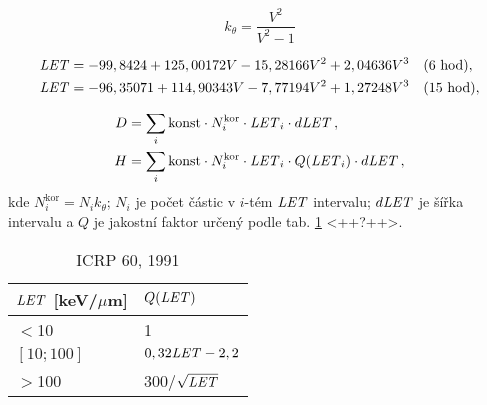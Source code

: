 \begin{equation}
  k_{\theta}=\frac{V^2}{V^2-1}
  \label{eq:kritickyUhel}
\end{equation}


\cite{ssntd}
\begin{align}
  \mathit{LET} &= -99,8424+125,00172  V-15,28166  V^2+2,04636  V^3\quad\text{(6 hod)},\label{eq:kalibracniKrivkaSestHod}\\
  \mathit{LET} &= -96,35071+114,90343  V-7,77194  V^2+1,27248  V^3\quad\text{(15 hod)},\label{eq:kalibracniKrivkaPatnactHod}
\end{align}

\begin{align}
  D&=\sum_i\text{konst}\cdot N_i^{\text{kor}}\cdot \mathit{LET}_i\cdot d\mathit{LET}\,,\label{eq:Davka}\\
  H&=\sum_i\text{konst}\cdot N_i^{\text{kor}}\cdot \mathit{LET}_i\cdot Q(\mathit{LET}_i)\cdot d\mathit{LET}\,,\label{eq:EkvDavka}
\end{align}
kde $N_i^{\text{kor}}=N_ik_{\theta}$; $N_i$ je počet částic v $i$-tém $\mathit{LET}$ intervalu; $d\mathit{LET}$ je šířka intervalu a $Q$ je jakostní faktor určený podle tab. \ref{tab:detektory_Q} <++?++>.
\begin{table}[H]
  \centering
  \begin{tabular}{ll}
	\toprule
	$\mathit{LET}$ [keV/$\mu$m]&$Q(\mathit{LET})$ \\
	\midrule
$<$10&1\\
$[10;100]$&$0,32\mathit{LET}-2,2$\\
$>$100&300/$\sqrt{\mathit{LET}}$\\
	\bottomrule
  \end{tabular}
  \caption{ICRP 60, 1991}
  \label{tab:detektory_Q}
\end{table}







